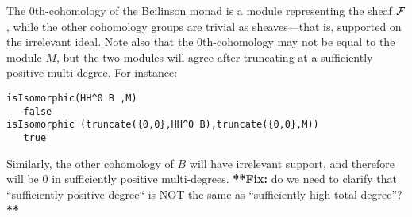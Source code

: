 \documentclass[twoside,12pt, leqno]{amsart}
\def\fix#1{{\bf ***Fix:} #1 {\bf ***}}
\begin{document}
The 0th-cohomology of the Beilinson monad is a module representing the sheaf ${\mathcal F}$,
while the other cohomology groups are trivial as sheaves---that is, supported on the irrelevant ideal. 
Note also that the 0th-cohomology may not be equal to the module $M$, but the two modules
will agree after  truncating at a sufficiently positive multi-degree.
For instance:
{\small
\begin{verbatim}
isIsomorphic(HH^0 B ,M)
   false
isIsomorphic (truncate({0,0},HH^0 B),truncate({0,0},M))
   true
\end{verbatim}}
\noindent Similarly, the other cohomology of $B$ will have irrelevant support, and therefore will be 0 in sufficiently positive multi-degrees.
\fix{do we need to clarify that ``sufficiently positive degree`` is NOT the same as ``sufficiently high total degree''?}
\end{document}
